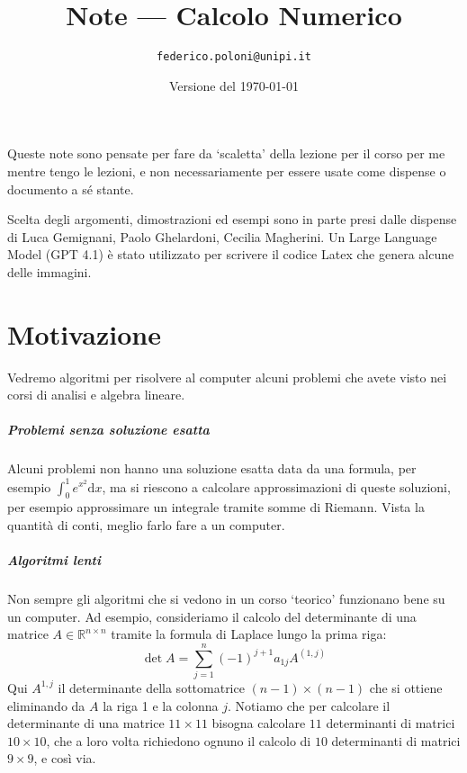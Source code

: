 \documentclass[a4paper]{report}
\title{Note --- Calcolo Numerico}
\author{\texttt{federico.poloni@unipi.it}}
\date{Versione del \today}
\theoremstyle{definiton}
\theoremstyle{remark}
\begin{document}
\maketitle

Queste note sono pensate per fare da `scaletta' della lezione per il corso per me mentre tengo le lezioni, e non necessariamente per essere usate come dispense o documento a sé stante.

Scelta degli argomenti, dimostrazioni ed esempi sono in parte presi dalle dispense di Luca Gemignani, Paolo Ghelardoni, Cecilia Magherini. Un Large Language Model (GPT 4.1) è stato utilizzato per scrivere il codice Latex che genera alcune delle immagini.

\chapter{Motivazione}

Vedremo algoritmi per risolvere al computer alcuni problemi che avete visto nei corsi di analisi e algebra lineare. 

\paragraph{Problemi senza soluzione esatta} Alcuni problemi non hanno una soluzione esatta data da una formula, per esempio $\int_0^1 e^{x^2} \mathrm{d}x$, ma si riescono a calcolare approssimazioni di queste soluzioni, per esempio approssimare un integrale tramite somme di Riemann. Vista la quantità di conti, meglio farlo fare a un computer.

\paragraph{Algoritmi lenti} Non sempre gli algoritmi che si vedono in un corso `teorico' funzionano bene su un computer. Ad esempio, consideriamo il calcolo del determinante di una matrice $A \in \mathbb{R}^{n\times n}$ tramite la formula di Laplace lungo la prima riga:
\[
    \det A = \sum_{j=1}^n (-1)^{j+1} a_{1j} A^{(1,j)}
\]
Qui $A^{1,j}$ il determinante della sottomatrice $(n-1)\times (n-1)$ che si ottiene eliminando da $A$ la riga 1 e la colonna $j$. Notiamo che per calcolare il determinante di una matrice $11\times 11$ bisogna calcolare $11$ determinanti di matrici $10\times 10$, che a loro volta richiedono ognuno il calcolo di $10$ determinanti di matrici $9\times 9$, e così via.
\end{document}
